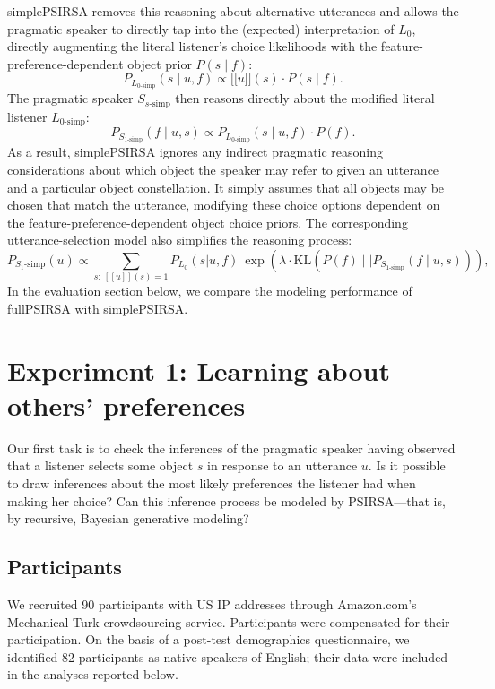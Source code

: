 \documentclass[10pt,a4paper]{article}
\newcommand{\sem}[1]{\mbox{$[\![$#1$]\!]$}}
\begin{document}
simplePSIRSA removes this reasoning about alternative utterances and allows the pragmatic speaker to directly tap into the (expected) interpretation of $L_0$, directly augmenting the literal listener's choice likelihoods with the feature-preference-dependent object prior $P(s\mid f)$:
$$P_{L_{0\textrm{-simp}}}(s\mid u,f) \propto \sem{$u$}(s) \cdot P(s\mid f).$$
The pragmatic speaker $S_{s\textrm{-simp}}$ then reasons directly about the modified literal listener $L_{0\textrm{-simp}}$: 
$$P_{S_{1\textrm{-simp}}}(f\mid u,s) \propto P_{L_{0\textrm{-simp}}}(s\mid u,f) \cdot P(f).$$
As a result, simplePSIRSA ignores any indirect pragmatic reasoning considerations about which object the speaker may refer to given an utterance and a particular object constellation.
It simply assumes that all objects may be chosen that match the utterance, modifying these choice options dependent on the feature-preference-dependent object choice priors. The corresponding utterance-selection model also simplifies the reasoning process:
$$P_{S_1\textrm{-simp}}(u) \propto \sum_{s:\  [\![u]\!](s)=1} P_{L_0}(s|u,f)\ \exp(\lambda \cdot \textrm{KL}(P(f)\mid\mid P_{S_{1\textrm{-simp}}}(f\mid u,s))),$$
In the evaluation section below, we compare the modeling performance of fullPSIRSA with simplePSIRSA. 


\section{Experiment 1: Learning about others' preferences}

Our first task is to check the inferences of the pragmatic speaker having observed that a listener selects some object $s$ in response to an utterance $u$. 
Is it possible to draw inferences about the most likely preferences the listener had when making her choice? 
Can this inference process be modeled by PSIRSA---that is, by recursive, Bayesian generative modeling?

\subsection{Participants}

We recruited 90 participants with US IP addresses through Amazon.com's Mechanical Turk crowdsourcing service. Participants were compensated for their participation. On the basis of a post-test demographics questionnaire, we identified 82 participants as native speakers of English; their data were included in the analyses reported below.
\end{document}
